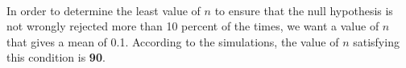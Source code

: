 \documentclass[answers]{exam}
\begin{document}
\begin{figure}
  \centering
  \mbox{\quad
  }
\end{figure}
In order to determine the least value of $n$ to ensure that the null hypothesis is not wrongly rejected more than 10 percent of the times, we want a value of $n$ that gives a mean of 0.1. According to the simulations, the value of $n$ satisfying this condition is \textbf{90}. 
\end{document}
